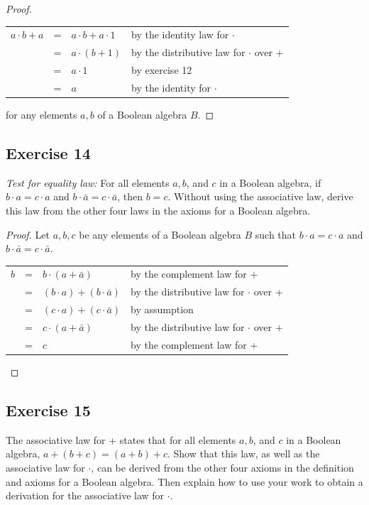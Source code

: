 \documentclass[14pt]{extarticle}
\newcommand{\cy}{\color{cyan}}
\begin{document}
\begin{proof}
\begin{center}
\begin{tabular}{rcll}
\(a \cdot b + a\) & = & \(a \cdot b + a \cdot 1\) & {\cy by the identity law for $\cdot$} \\
& = & \(a \cdot (b + 1)\) & {\cy by the distributive law for $\cdot$ over +} \\
& = & \(a \cdot 1\) & {\cy by exercise 12} \\
& = & \(a\) & {\cy by the identity for $\cdot$}
\end{tabular}
\end{center}
for any elements $a, b$ of a Boolean algebra $B$.
\end{proof}

\subsection{Exercise 14}
{\it Test for equality law:} For all elements $a, b$, and $c$ in a Boolean algebra, if \(b \cdot a = c \cdot a\) and 
\(b \cdot \bar{a} = c \cdot \bar{a}\), then $b = c$. Without using the associative law, derive this law from the 
other four laws in the axioms for a Boolean algebra.

\begin{proof}
Let $a, b, c$ be any elements of a Boolean algebra $B$ such that \(b \cdot a = c \cdot a\) and 
\(b \cdot \bar{a} = c \cdot \bar{a}\). 
\begin{center}
\begin{tabular}{rcll}
\(b\) & = & \(b \cdot (a + \bar{a})\) & {\cy by the complement law for +} \\
& = & \((b \cdot a) + (b \cdot \bar{a})\) & {\cy by the distributive law for $\cdot$ over +} \\
& = & \((c \cdot a) + (c \cdot \bar{a})\) & {\cy by assumption} \\
& = & \(c \cdot (a + \bar{a})\) & {\cy by the distributive law for $\cdot$ over +} \\
& = & \(c\) & {\cy by the complement law for +}
\end{tabular}
\end{center}
\end{proof}

\subsection{Exercise 15}
The associative law for + states that for all elements $a, b$, and $c$ in a Boolean algebra, \(a+(b+c) = (a+b)+c\). 
Show that this law, as well as the associative law for $\cdot$, can be derived from the other four axioms in the 
definition and axioms for a Boolean algebra. Then explain how to use your work to obtain a derivation for the 
associative law for $\cdot$.
\end{document}
